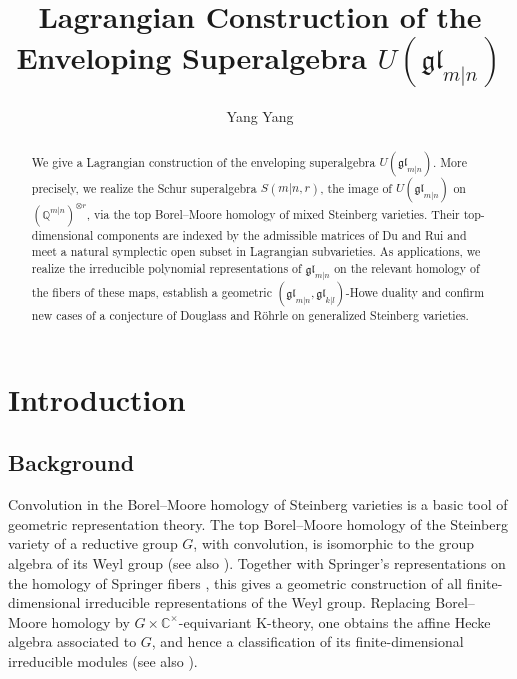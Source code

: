 \documentclass[11pt,a4paper]{amsart}
\title[Lagrangian construction of $U(\mathfrak{gl}_{m|n})$]
{Lagrangian Construction of the Enveloping Superalgebra
$U(\mathfrak{gl}_{m|n})$}
\author{Yang Yang}
\theoremstyle{definition}
\theoremstyle{remark}
\newcommand{\C}{\mathbb C}
\newcommand{\Q}{\mathbb Q}
\numberwithin{equation}{section}
\begin{document}
\begin{abstract}
We give a Lagrangian construction of the enveloping superalgebra
$U(\mathfrak{gl}_{m|n})$. More precisely, we realize the Schur
superalgebra $S(m|n,r)$, the image of $U(\mathfrak{gl}_{m|n})$ on
$(\Q^{m|n})^{\otimes r}$, via the top Borel--Moore homology of mixed
Steinberg varieties. Their top-dimensional components are indexed by the admissible
matrices of Du and Rui and meet a natural symplectic open subset in
Lagrangian subvarieties. As applications, we realize the irreducible
polynomial representations of $\mathfrak{gl}_{m|n}$ on the relevant
homology of the fibers of these maps, establish a geometric
$(\mathfrak{gl}_{m|n},\mathfrak{gl}_{k|l})$-Howe duality and confirm new
cases of a conjecture of Douglass and R\"ohrle on generalized Steinberg
varieties.
\end{abstract}
\maketitle
\tableofcontents

\section{Introduction}
\label{sec:intro}

\subsection{Background}
\enlargethispage{4pt}%

Convolution in the Borel--Moore homology of Steinberg varieties is a
basic tool of geometric representation theory. The top Borel--Moore
homology of the Steinberg variety of a reductive group $G$, with
convolution, is isomorphic to the group algebra of its Weyl group
\cite{KT84,Gin86} (see also \cite[Section~3.4]{CG}). Together with
Springer's representations on the homology of Springer fibers
\cite{Spr76}, this gives a geometric construction of all finite-dimensional irreducible representations of the Weyl group. Replacing Borel--Moore homology by $G\times\C^\times$-equivariant \mbox{K-theory}, one obtains the affine Hecke algebra associated to $G$, and hence a classification of its finite-dimensional irreducible modules \cite{KL87,Gin87} (see also \cite[Chapter~7]{CG}).
\end{document}
